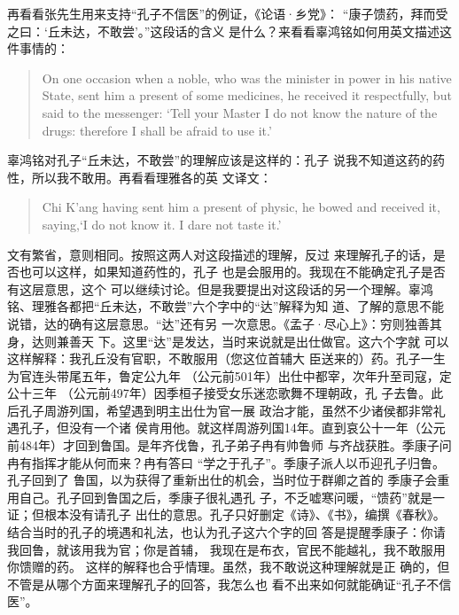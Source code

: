 再看看张先生用来支持“孔子不信医”的例证，《论语·乡党》：
“康子馈药，拜而受之曰：‘丘未达，不敢尝’。”这段话的含义
是什么？来看看辜鸿铭如何用英文描述这件事情的：
\begin{quote}
On one occasion when a noble, who was the minister in
power in his native State, sent him a present of some
medicines, he received it respectfully, but said to
the messenger: `Tell your Master I do not know the
nature of the drugs: therefore I shall be afraid to
use it.'
\end{quote}
辜鸿铭对孔子“丘未达，不敢尝”的理解应该是这样的：孔子
说我不知道这药的药性，所以我不敢用。再看看理雅各的英
文译文：
\begin{quote}
Chi K'ang having sent him a present of physic,
he bowed and received it, saying,`I do not know it.
I dare not taste it.'
\end{quote}
文有繁省，意则相同。按照这两人对这段描述的理解，反过
来理解孔子的话，是否也可以这样，如果知道药性的，孔子
也是会服用的。我现在不能确定孔子是否有这层意思，这个
可以继续讨论。但是我要提出对这段话的另一个理解。辜鸿
铭、理雅各都把“丘未达，不敢尝”六个字中的“达”解释为知
道、了解的意思不能说错，达的确有这层意思。“达”还有另
一次意思。《孟子·尽心上》：穷则独善其身，达则兼善天
下。这里“达”是发达，当时来说就是出仕做官。这六个字就
可以这样解释：我孔丘没有官职，不敢服用（您这位首辅大
臣送来的）药。孔子一生为官连头带尾五年，鲁定公九年
（公元前501年）出仕中都宰，次年升至司寇，定公十三年
（公元前497年）因季桓子接受女乐迷恋歌舞不理朝政，孔
子去鲁。此后孔子周游列国，希望遇到明主出仕为官一展
政治才能，虽然不少诸侯都非常礼遇孔子，但没有一个诸
侯肯用他。就这样周游列国14年。直到哀公十一年（公元
前484年）才回到鲁国。是年齐伐鲁，孔子弟子冉有帅鲁师
与齐战获胜。季康子问冉有指挥才能从何而来？冉有答曰
“学之于孔子”。季康子派人以币迎孔子归鲁。孔子回到了
鲁国，以为获得了重新出仕的机会，当时位于群卿之首的
季康子会重用自己。孔子回到鲁国之后，季康子很礼遇孔
子，不乏嘘寒问暖，“馈药”就是一证；但根本没有请孔子
出仕的意思。孔子只好删定《诗》、《书》，编撰《春秋》。
结合当时的孔子的境遇和礼法，也认为孔子这六个字的回
答是提醒季康子：你请我回鲁，就该用我为官；你是首辅，
我现在是布衣，官民不能越礼，我不敢服用你馈赠的药。
这样的解释也合乎情理。虽然，我不敢说这种理解就是正
确的，但不管是从哪个方面来理解孔子的回答，我怎么也
看不出来如何就能确证“孔子不信医”。

